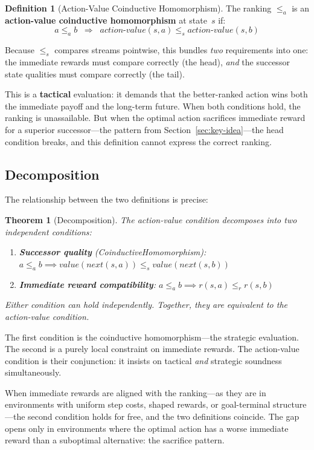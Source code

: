 \documentclass[9pt,a4paper]{article}
\theoremstyle{plain}
\newtheorem{theorem}{Theorem}
\theoremstyle{definition}
\newtheorem{definition}{Definition}
\theoremstyle{remark}
\begin{document}
\begin{definition}[Action-Value Coinductive Homomorphism]\label{def:coindhomo}
The ranking $\le_a$ is an \textbf{action-value coinductive homomorphism} at state~$s$ if:
\[
a \le_a b \;\;\Longrightarrow\;\; \mathit{action\text{-}value}(s,a) \le_s \mathit{action\text{-}value}(s,b)
\]
\end{definition}

\noindent Because $\le_s$ compares streams pointwise, this bundles \emph{two} requirements into one: the immediate rewards must compare correctly (the head), \emph{and} the successor state qualities must compare correctly (the tail).

This is a \textbf{tactical} evaluation: it demands that the better-ranked action wins both the immediate payoff and the long-term future.  When both conditions hold, the ranking is unassailable.  But when the optimal action sacrifices immediate reward for a superior successor---the pattern from Section~\ref{sec:key-idea}---the head condition breaks, and this definition cannot express the correct ranking.

\subsection{Decomposition}

The relationship between the two definitions is precise:

\begin{theorem}[Decomposition]\label{thm:decomposition}
The action-value condition decomposes into two independent conditions:
\begin{enumerate}
\item \textbf{Successor quality} (CoinductiveHomomorphism): $a \le_a b \implies \mathit{value}(\mathit{next}(s,a)) \le_s \mathit{value}(\mathit{next}(s,b))$
\item \textbf{Immediate reward compatibility}: $a \le_a b \implies r(s,a) \le_r r(s,b)$
\end{enumerate}
Either condition can hold independently.  Together, they are equivalent to the action-value condition.
\end{theorem}

The first condition is the coinductive homomorphism---the strategic evaluation.
The second is a purely local constraint on immediate rewards.
The action-value condition is their conjunction: it insists on tactical \emph{and} strategic soundness simultaneously.

When immediate rewards are aligned with the ranking---as they are in environments with uniform step costs, shaped rewards, or goal-terminal structure---the second condition holds for free, and the two definitions coincide.  The gap opens only in environments where the optimal action has a worse immediate reward than a suboptimal alternative: the sacrifice pattern.
\end{document}
